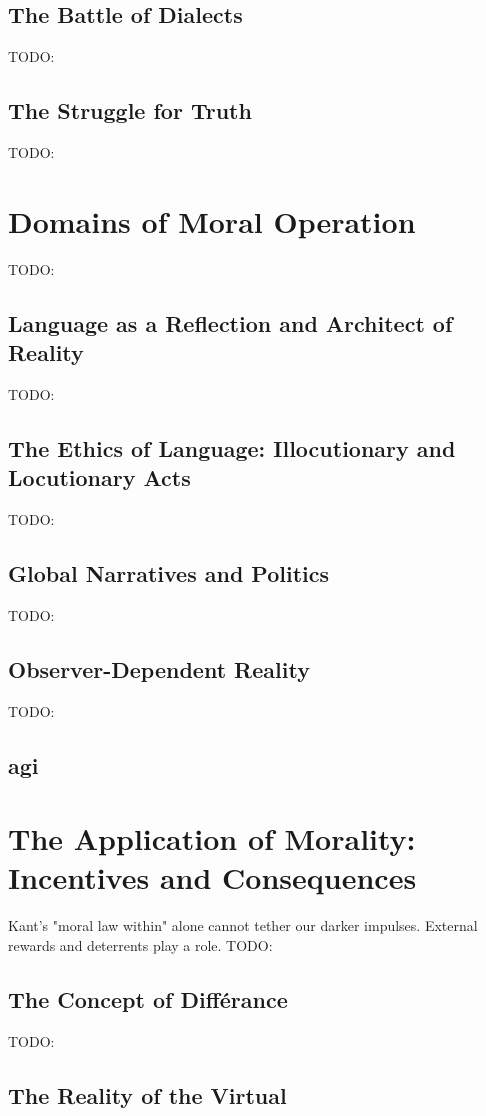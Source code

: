\documentclass[12pt,a4]{article}
\begin{document}
    \subsection{The Battle of Dialects}
    TODO:
    \subsection{The Struggle for Truth}
    TODO:

\section{Domains of Moral Operation}
    TODO:

    \subsection{Language as a Reflection and Architect of Reality}
    TODO:
    \subsection{The Ethics of Language: Illocutionary and Locutionary Acts}
    TODO:
    \subsection{Global Narratives and Politics}
    TODO:
    \subsection{Observer-Dependent Reality}
    TODO:
    \subsection{\ac{agi}}

\section{The Application of Morality: Incentives and Consequences}
    
    Kant's "moral law within" alone cannot tether our darker impulses. External rewards and deterrents play a role.
    TODO:

    \subsection{The Concept of Différance}
    TODO:

    \subsection{The Reality of the Virtual}
         
\end{document}
